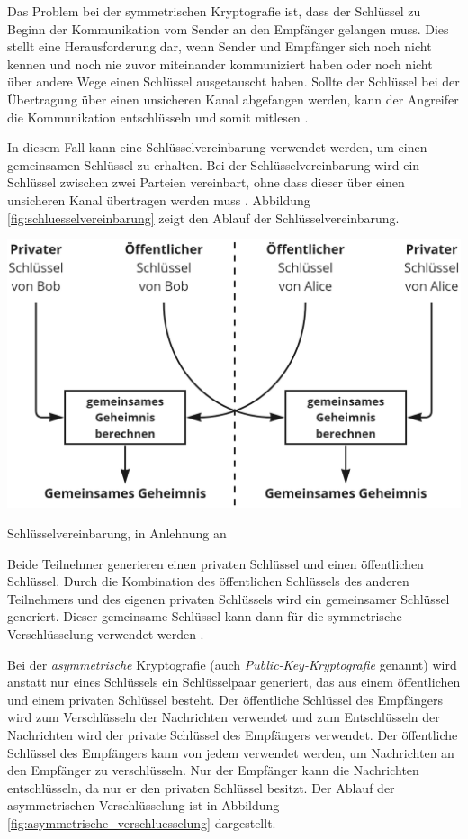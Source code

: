 \noindent Das Problem bei der symmetrischen Kryptografie ist, dass der Schlüssel zu Beginn der Kommunikation vom Sender an den Empfänger gelangen muss. Dies stellt eine Herausforderung dar, wenn Sender und Empfänger sich noch nicht kennen und noch nie zuvor miteinander kommuniziert haben oder noch nicht über andere Wege einen Schlüssel ausgetauscht haben. Sollte der Schlüssel bei der Übertragung über einen unsicheren Kanal abgefangen werden, kann der Angreifer die Kommunikation entschlüsseln und somit mitlesen \Parencites[S. 644]{DiffieHellman_NewDirectionsInCryptography}[S. 5-8]{Wong_KryptoPraxis}. 

In diesem Fall kann eine Schlüsselvereinbarung verwendet werden, um einen gemeinsamen Schlüssel zu erhalten. Bei der Schlüsselvereinbarung wird ein Schlüssel zwischen zwei Parteien vereinbart, ohne dass dieser über einen unsicheren Kanal übertragen werden muss \Parencite[S. 102]{Wong_KryptoPraxis}. Abbildung \ref{fig:schluesselvereinbarung} zeigt den Ablauf der Schlüsselvereinbarung.

\begin{center}
    \captionsetup{type=figure}
    \includegraphics[width=0.7\linewidth]{images/key_exchange.png}
    \caption{Schlüsselvereinbarung, in Anlehnung an \cite[S. 102]{Wong_KryptoPraxis}}
    \label{fig:schluesselvereinbarung}
\end{center}

\noindent Beide Teilnehmer generieren einen privaten Schlüssel und einen öffentlichen Schlüssel. Durch die Kombination des öffentlichen Schlüssels des anderen Teilnehmers und des eigenen privaten Schlüssels wird ein gemeinsamer Schlüssel generiert. Dieser gemeinsame Schlüssel kann dann für die symmetrische Verschlüsselung verwendet werden \Parencite[S. 102]{Wong_KryptoPraxis}.


Bei der \textit{asymmetrische} Kryptografie (auch \textit{Public-Key-Kryptografie} genannt) wird anstatt nur eines Schlüssels ein Schlüsselpaar generiert, das aus einem öffentlichen und einem privaten Schlüssel besteht. Der öffentliche Schlüssel des Empfängers wird zum Verschlüsseln der Nachrichten verwendet und zum Entschlüsseln der Nachrichten wird der private Schlüssel des Empfängers verwendet. Der öffentliche Schlüssel des Empfängers kann von jedem verwendet werden, um Nachrichten an den Empfänger zu verschlüsseln. Nur der Empfänger kann die Nachrichten entschlüsseln, da nur er den privaten Schlüssel besitzt. Der Ablauf der asymmetrischen Verschlüsselung ist in Abbildung \ref{fig:asymmetrische_verschluesselung} dargestellt.


